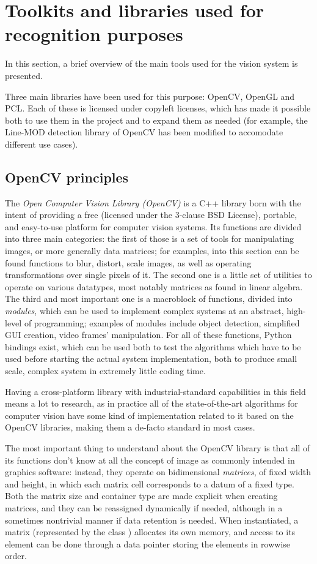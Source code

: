 \section{Toolkits and libraries used for recognition purposes}
In this section, a brief overview of the main tools used for the
vision system is presented.

Three main libraries have been used for this purpose: OpenCV, OpenGL
and PCL. Each of these is licensed under copyleft licenses, which has made
it possible both to use them in the project and to expand them as
needed (for example, the Line-MOD detection library of OpenCV has been
modified to accomodate different use cases).

\subsection{OpenCV principles}
The \emph{Open Computer Vision Library (\emph{OpenCV})} is a C++
library born with the intent of providing a free (licensed under the
3-clause BSD License), portable, and easy-to-use platform for computer
vision systems. Its functions are divided into three main categories:
the first of those is a set of tools for manipulating images, or more
generally data matrices; for examples, into this section can be found
functions to blur, distort, scale images, as well as operating
transformations over single pixels of it. The second one is a little set of utilities
to operate on various datatypes, most notably matrices as found in
linear algebra. The third and most important one is a macroblock of
functions, divided into \emph{modules}, which can be used to implement
complex systems at an abstract, high-level of programming; examples of
modules include object detection, simplified GUI creation, video
frames' manipulation. For all of these functions, Python bindings
exist, which can be used both to test the algorithms which have to be used
before starting the actual system implementation, both to produce
small scale, complex system in extremely little coding time.

Having a cross-platform library with industrial-standard capabilities
in this field means a lot to research, as in practice all of the
state-of-the-art algorithms for computer vision have some kind of
implementation related to it based on the OpenCV libraries, making
them a de-facto standard in most cases.

The most important thing to understand about the OpenCV library is
that all of its functions don't know at all the concept of image as
commonly intended in graphics software: instead, they operate on
bidimensional \emph{matrices}, of fixed width and height, in
which each matrix cell corresponds to a datum of a fixed type. Both
the matrix size and container type are made explicit when creating
matrices, and they can be reassigned dynamically if needed, although
in a sometimes nontrivial manner if data retention is needed. When
instantiated, a matrix (represented by the class )
allocates its own memory, and access to its element can be done
through a data pointer storing the elements in rowwise order.

